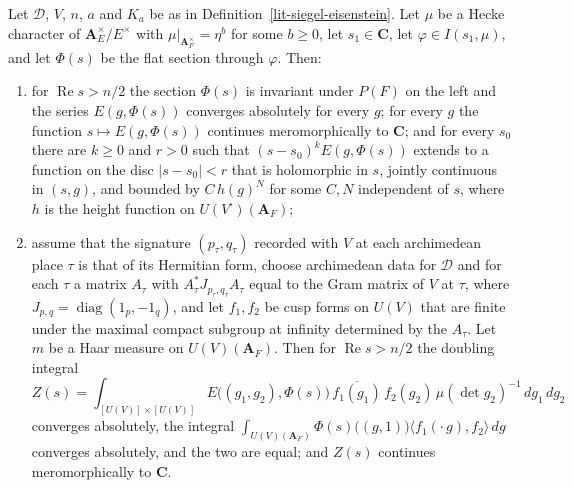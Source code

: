 \begin{theorem}\label{lit-doubling}
Let $\mathcal D$, $V$, $n$, $a$ and $K_a$ be as in
Definition~\ref{lit-siegel-eisenstein}. Let $\mu$ be a Hecke character of
$\mathbf A_E^\times/E^\times$ with $\mu|_{\mathbf A_F^\times}=\eta^b$ for some
$b\ge0$, let $s_1\in\mathbf C$, let $\varphi\in I(s_1,\mu)$, and let
$\Phi(s)$ be the flat section through $\varphi$. Then:
\begin{enumerate}
\item for $\operatorname{Re}s>n/2$ the section $\Phi(s)$ is invariant under
  $P(F)$ on the left and the series $E(g,\Phi(s))$ converges absolutely for
  every $g$; for every $g$ the function $s\mapsto E(g,\Phi(s))$ continues
  meromorphically to $\mathbf C$; and for every $s_0$ there are $k\ge0$ and
  $r>0$ such that $(s-s_0)^kE(g,\Phi(s))$ extends to a function on the disc
  $|s-s_0|<r$ that is holomorphic in $s$, jointly continuous in $(s,g)$, and
  bounded by $C\,h(g)^N$ for some $C,N$ independent of $s$, where $h$ is
  the height function on $U(V^\square)(\mathbf A_F)$;
\item assume that the signature $(p_\tau,q_\tau)$ recorded with $V$ at each
  archimedean place $\tau$ is that of its Hermitian form, choose archimedean
  data for $\mathcal D$ and for each $\tau$ a matrix $A_\tau$ with
  $A_\tau^*J_{p_\tau,q_\tau}A_\tau$ equal to the Gram matrix of $V$ at $\tau$,
  where $J_{p,q}=\operatorname{diag}(1_p,-1_q)$, and let $f_1,f_2$ be cusp
  forms on $U(V)$ that are finite under the maximal compact subgroup at
  infinity determined by the $A_\tau$. Let $m$ be a Haar measure on $U(V)(\mathbf A_F)$. Then for
  $\operatorname{Re}s>n/2$ the doubling integral
  \[
  Z(s)=\int_{[U(V)]\times[U(V)]}E\bigl((g_1,g_2),\Phi(s)\bigr)\,
  \overline{f_1(g_1)}\,f_2(g_2)\,\mu(\det g_2)^{-1}\,dg_1\,dg_2
  \]
  converges absolutely, the integral
  $\int_{U(V)(\mathbf A_F)}\Phi(s)\bigl((g,1)\bigr)\langle f_1(\cdot\,g),f_2\rangle\,dg$
  converges absolutely, and the two are equal; and $Z(s)$ continues
  meromorphically to $\mathbf C$.
\end{enumerate}
\end{theorem}

